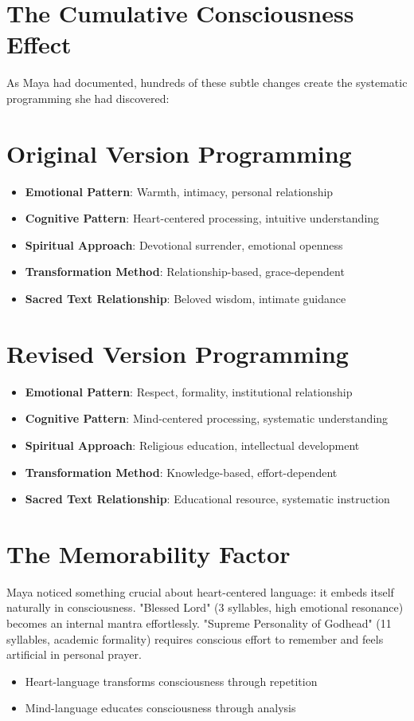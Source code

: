 \documentclass[11pt,twoside]{book}
\begin{document}
\section*{The Cumulative Consciousness Effect}
\label{sec:orgf937226}

As Maya had documented, hundreds of these subtle changes create the systematic programming she had discovered:
\section*{Original Version Programming}
\label{sec:org691a9f7}
\begin{itemize}
\item \textbf{\textbf{Emotional Pattern}}: Warmth, intimacy, personal relationship
\item \textbf{\textbf{Cognitive Pattern}}: Heart-centered processing, intuitive understanding
\item \textbf{\textbf{Spiritual Approach}}: Devotional surrender, emotional openness
\item \textbf{\textbf{Transformation Method}}: Relationship-based, grace-dependent
\item \textbf{\textbf{Sacred Text Relationship}}: Beloved wisdom, intimate guidance
\end{itemize}
\section*{Revised Version Programming}
\label{sec:org6f4b43f}
\begin{itemize}
\item \textbf{\textbf{Emotional Pattern}}: Respect, formality, institutional relationship
\item \textbf{\textbf{Cognitive Pattern}}: Mind-centered processing, systematic understanding
\item \textbf{\textbf{Spiritual Approach}}: Religious education, intellectual development
\item \textbf{\textbf{Transformation Method}}: Knowledge-based, effort-dependent
\item \textbf{\textbf{Sacred Text Relationship}}: Educational resource, systematic instruction
\end{itemize}
\section*{The Memorability Factor}
\label{sec:orgaf31550}

Maya noticed something crucial about heart-centered language: it embeds itself naturally in consciousness. "Blessed Lord" (3 syllables, high emotional resonance) becomes an internal mantra effortlessly. "Supreme Personality of Godhead" (11 syllables, academic formality) requires conscious effort to remember and feels artificial in personal prayer.
\begin{itemize}
\item Heart-language transforms consciousness through repetition
\item Mind-language educates consciousness through analysis
\end{itemize}
\end{document}
